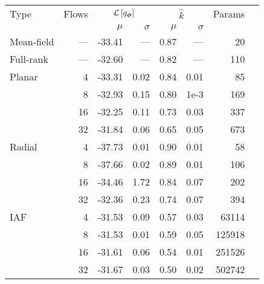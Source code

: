 \begin{tabular}{lrrrrrrr}
    \toprule
    Type       & Flows & \multicolumn{2}{c}{$\mathcal{L}\left[q_{\bm \phi}\right]$} & \multicolumn{2}{c}{$\hat{k}$} & Params                     \\\cmidrule(lr){3-4}\cmidrule(l){5-6}
               &       & $\mu$                       & $\sigma$                      & $\mu$  & $\sigma$          \\
    \midrule
    Mean-field & ---   & -33.41                      & ---                           & 0.87   & ---      & 20     \\
    Full-rank  & ---   & -32.60                      & ---                           & 0.82   & ---      & 110    \\\addlinespace
    Planar     & 4     & -33.31                      & 0.02                          & 0.84   & 0.01     & 85     \\
               & 8     & -32.93                      & 0.15                          & 0.80   & 1e-3     & 169    \\
               & 16    & -32.25                      & 0.11                          & 0.73   & 0.03     & 337    \\
               & 32    & -31.84                      & 0.06                          & 0.65   & 0.05     & 673    \\\addlinespace
    Radial     & 4     & -37.73                      & 0.01                          & 0.90   & 0.01     & 58     \\
               & 8     & -37.66                      & 0.02                          & 0.89   & 0.01     & 106    \\
               & 16    & -34.46                      & 1.72                          & 0.84   & 0.07     & 202    \\
               & 32    & -32.36                      & 0.23                          & 0.74   & 0.07     & 394    \\\addlinespace
    IAF        & 4     & -31.53                      & 0.09                          & 0.57   & 0.03     & 63114  \\
               & 8     & -31.53                      & 0.01                          & 0.59   & 0.05     & 125918 \\
               & 16    & -31.61                      & 0.06                          & 0.54   & 0.01     & 251526 \\
               & 32    & -31.67                      & 0.03                          & 0.50   & 0.02     & 502742 \\
    \bottomrule
\end{tabular}
